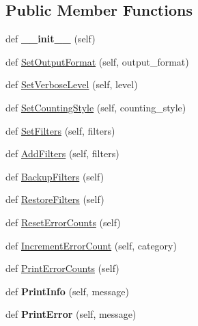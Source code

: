 \subsection*{Public Member Functions}
\begin{DoxyCompactItemize}
\item 
def {\bfseries \+\_\+\+\_\+init\+\_\+\+\_\+} (self)\hypertarget{classcpplint_1_1__CppLintState_a9cc2db6b8d2e3b757fc48fb3c2fd4d8b}{}\label{classcpplint_1_1__CppLintState_a9cc2db6b8d2e3b757fc48fb3c2fd4d8b}

\item 
def \hyperlink{classcpplint_1_1__CppLintState_ab43553d2e2027b58d08a7001c71c0902}{Set\+Output\+Format} (self, output\+\_\+format)
\item 
def \hyperlink{classcpplint_1_1__CppLintState_ad4f97c907cc79e8d60237d0327830588}{Set\+Verbose\+Level} (self, level)
\item 
def \hyperlink{classcpplint_1_1__CppLintState_ac2503f2d8a357edd3ca648d219c7317e}{Set\+Counting\+Style} (self, counting\+\_\+style)
\item 
def \hyperlink{classcpplint_1_1__CppLintState_a359d4516eac0c1dce6223cf18181ac80}{Set\+Filters} (self, filters)
\item 
def \hyperlink{classcpplint_1_1__CppLintState_a248c70895572f2468d3c842faff2f285}{Add\+Filters} (self, filters)
\item 
def \hyperlink{classcpplint_1_1__CppLintState_a2444e784910e03681de22f43d4077dd1}{Backup\+Filters} (self)
\item 
def \hyperlink{classcpplint_1_1__CppLintState_a7a9c9fdfe033ebe1933450b4ae524598}{Restore\+Filters} (self)
\item 
def \hyperlink{classcpplint_1_1__CppLintState_ab802596abd5fba5e290e090388b6842a}{Reset\+Error\+Counts} (self)
\item 
def \hyperlink{classcpplint_1_1__CppLintState_a27a33a5049850d52cc8aef3478ca445a}{Increment\+Error\+Count} (self, category)
\item 
def \hyperlink{classcpplint_1_1__CppLintState_a3149156b00f8d53e5625256e3df2b4f0}{Print\+Error\+Counts} (self)
\item 
def {\bfseries Print\+Info} (self, message)\hypertarget{classcpplint_1_1__CppLintState_ae1b60a4c3b0913b9897a7876e4527ed3}{}\label{classcpplint_1_1__CppLintState_ae1b60a4c3b0913b9897a7876e4527ed3}

\item 
def {\bfseries Print\+Error} (self, message)\hypertarget{classcpplint_1_1__CppLintState_ad89cb7cbef4b3b4c5f12e3cdc100c7a4}{}\label{classcpplint_1_1__CppLintState_ad89cb7cbef4b3b4c5f12e3cdc100c7a4}


\end{DoxyCompactItemize}
